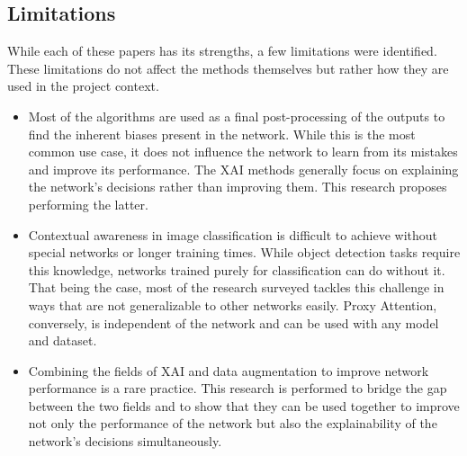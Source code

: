 \subsection{Limitations}
While each of these papers has its strengths, a few limitations were identified. These limitations do not affect the methods themselves but rather how they are used in the project context.
\begin{itemize}
    \item Most of the algorithms are used as a final post-processing of the outputs to find the inherent biases present in the network. While this is the most common use case, it does not influence the network to learn from its mistakes and improve its performance. The XAI methods generally focus on explaining the network's decisions rather than improving them. This research proposes performing the latter.
    \item Contextual awareness in image classification is difficult to achieve without special networks or longer training times. While object detection tasks require this knowledge, networks trained purely for classification can do without it. That being the case, most of the research surveyed tackles this challenge in ways that are not generalizable to other networks easily. Proxy Attention, conversely, is independent of the network and can be used with any model and dataset. 
    \item Combining the fields of XAI and data augmentation to improve network performance is a rare practice. This research is performed to bridge the gap between the two fields and to show that they can be used together to improve not only the performance of the network but also the explainability of the network's decisions simultaneously.

\end{itemize}
